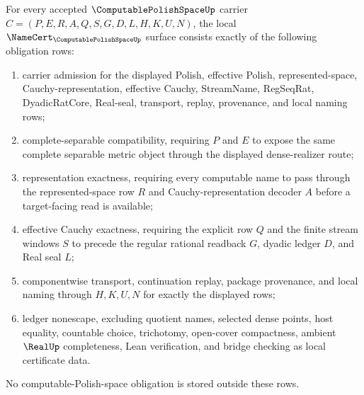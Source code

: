 
\begin{theorem}\label{thm:computable-polish-space-namecert-obligations}
For every accepted $\ComputablePolishSpaceUp$ carrier $C=(P,E,R,A,Q,S,G,D,L,H,K,U,N)$, the local $\NameCert_{\ComputablePolishSpaceUp}$ surface consists exactly of the following obligation rows:
\begin{enumerate}
\item carrier admission for the displayed Polish, effective Polish, represented-space, Cauchy-representation, effective Cauchy, StreamName, RegSeqRat, DyadicRatCore, Real-seal, transport, replay, provenance, and local naming rows;
\item complete-separable compatibility, requiring $P$ and $E$ to expose the same complete separable metric object through the displayed dense-realizer route;
\item representation exactness, requiring every computable name to pass through the represented-space row $R$ and Cauchy-representation decoder $A$ before a target-facing read is available;
\item effective Cauchy exactness, requiring the explicit row $Q$ and the finite stream windows $S$ to precede the regular rational readback $G$, dyadic ledger $D$, and Real seal $L$;
\item componentwise transport, continuation replay, package provenance, and local naming through $H,K,U,N$ for exactly the displayed rows;
\item ledger nonescape, excluding quotient names, selected dense points, host equality, countable choice, trichotomy, open-cover compactness, ambient $\RealUp$ completeness, Lean verification, and bridge checking as local certificate data.
\end{enumerate}
No computable-Polish-space obligation is stored outside these rows.
\end{theorem}
